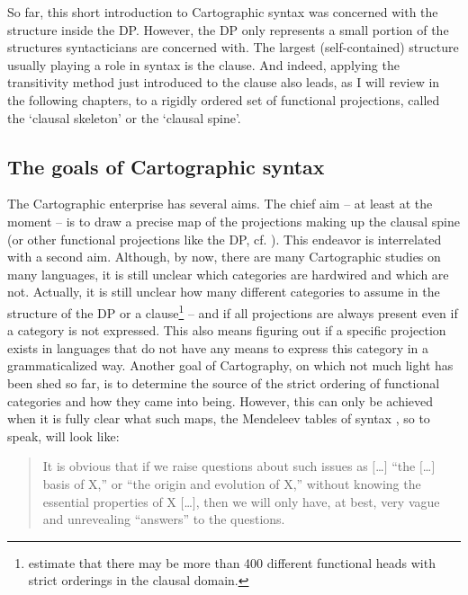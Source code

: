 So far, this short introduction to Cartographic syntax was concerned with the structure inside the DP. However, the DP only represents a small portion of the structures syntacticians are concerned with. The largest (self-contained) structure usually playing a role in syntax is the clause. And indeed, applying the transitivity method just introduced to the clause also leads, as I will review in the following chapters, to a rigidly ordered set of functional projections, called the `clausal skeleton' or the `clausal spine'. 

\subsection{The goals of Cartographic syntax}


The Cartographic enterprise has several aims. The chief aim -- at least at the moment -- is to draw a precise map of the projections making up the clausal spine (or other functional projections like the DP, cf. \citealt[3]{cinque2006restructuring}). This endeavor is interrelated with a second aim. Although, by now, there are many Cartographic studies on many languages, it is still unclear which categories are hardwired and which are not. Actually, it is still unclear how many different categories to assume in the structure of the DP or a clause\footnote{ \citet{cinque2010mapping} estimate that there may be more than 400 different functional heads with strict orderings in the clausal domain.} -- and if all projections are always present even if a category is not expressed. This also means figuring out if a specific projection exists in languages that do not have any means to express this category in a grammaticalized way. Another goal of Cartography, on which not much light has been shed so far, is to determine the source of the strict ordering of functional categories and how they came into being. However, this can only be achieved when it is fully clear what such maps, the Mendeleev tables of syntax \citep[199]{rizzi2013notes}, so to speak, will look like:

\begin{quote}
It is obvious that if we raise questions about such issues as $[$\dots $]$ ``the $[$\dots $]$ basis of X,'' or ``the origin and evolution of X,'' without knowing the essential properties of X $[$\dots $]$, then we will only have, at best, very vague and unrevealing ``answers'' to the questions. \citep[8]{fukui2004tro}
\end{quote}

